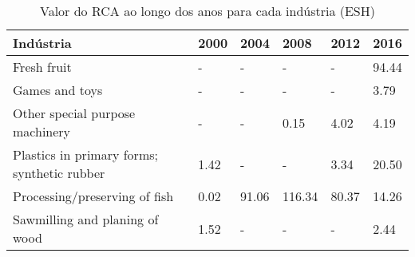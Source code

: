 \begin{table}
\centering
\caption{Valor do RCA ao longo dos anos para cada indústria (ESH)}
\label{tab:ex3-tempo-ESH}
\begin{tabular}{p{6cm}p{1.5cm}p{1.5cm}p{1.5cm}p{1.5cm}p{1.5cm}}
\toprule
                                  Indústria & 2000 &  2004 &   2008 &  2012 &  2016 \\
\midrule
                                Fresh fruit &    - &     - &      - &     - & 94.44 \\
                             Games and toys &    - &     - &      - &     - &  3.79 \\
            Other special purpose machinery &    - &     - &   0.15 &  4.02 &  4.19 \\
Plastics in primary forms; synthetic rubber & 1.42 &     - &      - &  3.34 & 20.50 \\
              Processing/preserving of fish & 0.02 & 91.06 & 116.34 & 80.37 & 14.26 \\
             Sawmilling and planing of wood & 1.52 &     - &      - &     - &  2.44 \\
\bottomrule
\end{tabular}
\end{table}
